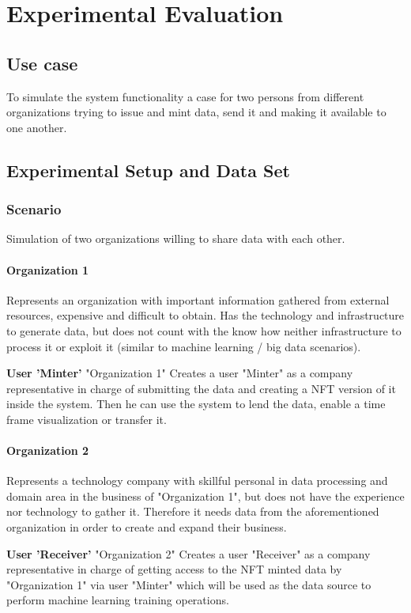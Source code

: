 
\chapter{Experimental Evaluation}
\label{ch:eval}

\section{Use case}
To simulate the system functionality a case for two persons from different organizations trying to issue and mint data, send it and making it available to one another.

\section{Experimental Setup and Data Set}
\subsection{Scenario}
Simulation of two organizations willing to share data with each other.
\subsubsection{Organization 1}
Represents an organization with important information gathered from external resources, expensive and difficult to obtain. Has the technology and infrastructure to generate data, but does not count with the know how neither infrastructure to process it or exploit it (similar to machine learning / big data scenarios).

\textbf{User 'Minter'}
"Organization 1" Creates a user "Minter" as a company representative in charge of submitting the data and creating a \ac{NFT} version of it inside the system. Then he can use the system to lend the data, enable a time frame visualization or transfer it.

\subsubsection{Organization 2}
Represents a technology company with skillful personal in data processing and domain area in the business of "Organization 1", but does not have the experience nor technology to gather it. Therefore it needs data from the aforementioned organization in order to create and expand their business.

\textbf{User 'Receiver'}
"Organization 2" Creates a user "Receiver"  as a company representative in charge of getting access to the \ac{NFT} minted data by "Organization 1" via user "Minter" which will be used as the data source to perform machine learning training operations. 

